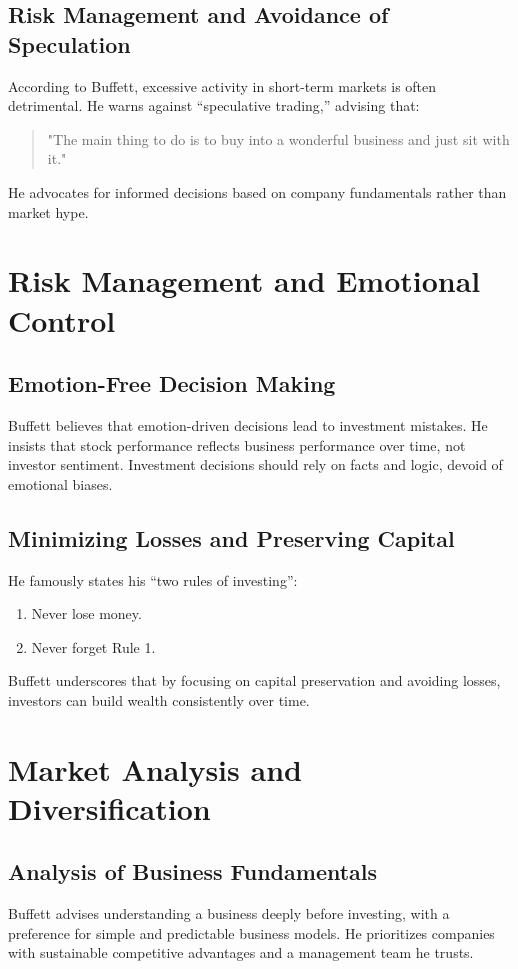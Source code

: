 \documentclass{article}
\begin{document}
\subsection*{Risk Management and Avoidance of Speculation}
According to Buffett, excessive activity in short-term markets is often detrimental. He warns against “speculative trading,” advising that:
\begin{quote}
    "The main thing to do is to buy into a wonderful business and just sit with it."
\end{quote}
He advocates for informed decisions based on company fundamentals rather than market hype.

\section{Risk Management and Emotional Control}

\subsection*{Emotion-Free Decision Making}
Buffett believes that emotion-driven decisions lead to investment mistakes. He insists that stock performance reflects business performance over time, not investor sentiment. Investment decisions should rely on facts and logic, devoid of emotional biases.

\subsection*{Minimizing Losses and Preserving Capital}
He famously states his “two rules of investing”:
\begin{enumerate}
    \item Never lose money.
    \item Never forget Rule 1.
\end{enumerate}
Buffett underscores that by focusing on capital preservation and avoiding losses, investors can build wealth consistently over time.

\section{Market Analysis and Diversification}

\subsection*{Analysis of Business Fundamentals}
Buffett advises understanding a business deeply before investing, with a preference for simple and predictable business models. He prioritizes companies with sustainable competitive advantages and a management team he trusts.
\end{document}

